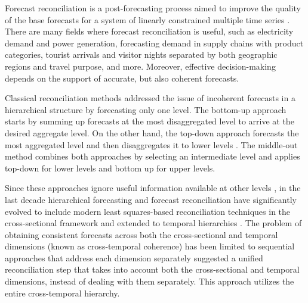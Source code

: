 \documentclass[a4paper,11pt]{article}
\theoremstyle{definition}
\begin{document}
Forecast reconciliation is a post-forecasting process aimed to improve the quality of the base forecasts for a system of linearly constrained multiple time series
\citep{hyndman2011, panagiotelis2021, giro2022}. There are many fields where forecast reconciliation is useful, such as electricity demand and power generation, forecasting demand in supply chains with product categories, tourist arrivals and visitor nights separated by both geographic regions and travel purpose, and more. Moreover, effective decision-making depends on the support of accurate, but also coherent forecasts.

Classical reconciliation methods addressed the issue of incoherent forecasts in a hierarchical structure by forecasting only one level. The bottom-up approach \citep{dunn1976} starts by summing up forecasts at the most disaggregated level to arrive at the desired aggregate level. On the other hand, the top-down approach \citep{gross1990} forecasts the most aggregated level and then disaggregates it to lower levels \citep{fliedner2001, athanasopoulos2009}. The middle-out method \citep{athanasopoulos2009} combines both approaches by selecting an intermediate level and applies top-down for lower levels and bottom up for upper levels.

Since these approaches ignore useful information available at other levels 	\citep{pennings2017}, in the last decade hierarchical forecasting and forecast reconciliation have significantly evolved to include modern least squares-based reconciliation techniques in the cross-sectional framework \citep{hyndman2011, wickramasuriya2019, panagiotelis2021} and extended to temporal hierarchies \citep{athanasopoulos2017, nystrup2020}. The problem of obtaining consistent forecasts across both the cross-sectional and temporal dimensions (known as cross-temporal coherence) has been limited to sequential approaches that address each dimension separately  \citep{kourentzes2019, yagli2019, punia2020, spiliotis2020, difonzo2023} suggested a unified reconciliation step that takes into account both the cross-sectional and temporal dimensions, instead of dealing with them separately. This approach utilizes the entire cross-temporal hierarchy.
\end{document}
